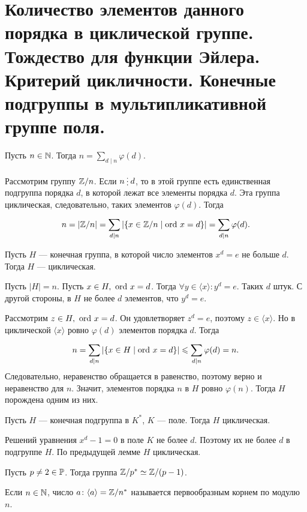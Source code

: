 % 
% 
\section{Количество элементов данного порядка в циклической группе. Тождество для функции Эйлера. Критерий цикличности. Конечные подгруппы в мультипликативной группе поля.}
\begin{lm}
    Пусть $ n \in  \mathbb{N}$. Тогда $ n = \sum\limits_{d \mid n}^{} \varphi (d) $.
\end{lm}
\begin{myproof*}
    Рассмотрим группу $ \mathbb{Z} /n$. Если  $ n \del d$, то в этой группе есть единственная подгруппа порядка  $ d$, в которой лежат все элементы порядка  $ d$. Эта группа циклическая, следовательно, таких элементов $ \varphi (d)$. Тогда
    \[
	n = \left| \mathbb{Z} / n  \right| =\sum_{d \mid n}^{} \left| \{x \in  \mathbb{Z} / n \mid {\mathop{\text{\rm ord}}}~ x = d\} \right|   = \sum_{d \mid n}^{} \varphi (d)
    .\] 
\end{myproof*}
\begin{lm}
    Пусть $ H$ --- конечная группа, в которой число элементов $ x^{d} = e$ не больше $ d$. Тогда  $ H$ --- циклическая.
\end{lm}
\begin{myproof*}
    Пусть $ \left| H \right| = n$. 
    Пусть $ x \in H, ~ {\mathop{\text{\rm ord}}}~ x = d$. Тогда $\forall y \in  \langle x \rangle\colon y^{d} = e$. Таких $ d$ штук. С другой стороны, в $ H$ не более  $ d$ элементов, что  $ y^{d} = e$.
    
    Рассмотрим $ z \in H, ~ {\mathop{\text{\rm ord}}}~ x = d$. Он удовлетворяет $ z^{d}=e$, поэтому $ z \in  \langle x \rangle$.  Но в циклической $ \langle x \rangle$ ровно $ \varphi (d)$ элементов  порядка $ d$.
    Тогда
    \[
	n = \sum_{d\mid n}^{} \left| \{x \in  H \mid {\mathop{\text{\rm ord}}}~ x = d \} \right|   \leqslant \sum_{d\mid n}^{} \varphi (d) = n 
    .\] 
    Следовательно, неравенство обращается в равенство, поэтому верно и неравенство для $ n$. Значит, элементов порядка $ n$ в  $H $ ровно  $ \varphi (n)$. Тогда $ H$ порождена одним из них.
\end{myproof*}
\begin{thm}
    Пусть $ H$ --- конечная подгруппа в $ K^{*}$, $ K$ --- поле. Тогда $ H$ циклическая.
\end{thm}
\begin{myproof*}
    Решений уравнения $ x^{d} - 1= 0$ в поле $ K$ не более  $ d$. Поэтому их не более  $ d$  в подгруппе  $ H$. По предыдущей лемме  $ H$ циклическая.
\end{myproof*}
\begin{cor}
    Пусть $ p\ne 2 \in \mathbb{P}$.  Тогда группа  $ \mathbb{Z} /p^{*} \simeq \mathbb{Z} /(p-1)$.
\end{cor}
\begin{defn}
    Если $ n \in \mathbb{N}$, число $ a\colon \langle a \rangle = \mathbb{Z} / n^{*}$ называется {\sf первообразным корнем по модулю $ n$}.  
\end{defn}
% 
